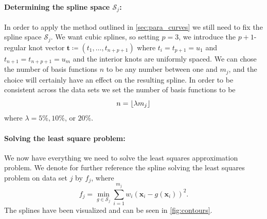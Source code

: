 \documentclass[article]{memoir}
\newcommand{\x}{\mathbf{x}}
\renewcommand{\t}{\mathbf{t}}
\renewcommand{\S}{\mathcal{S}}
\begin{document}
\paragraph{Determining the spline space \( \S_j \):}
In order to apply the method outlined in \cref{sec:para_curves} we still need
to fix the spline space \( \S_j \). We want cubic splines, so setting \( p = 3
\), we introduce the \( p + 1\)-regular knot vector \(\t \coloneqq (t_1, \dots,
t_{n+p+1})\) where \(t_i = t_{p+1} = u_{1}\) and \(t_{n+1} = t_{n+p+1} =
u_{m}\) and the interior knots are uniformly spaced. We can chose the number of
basis functions \( n \) to be any number between one and \( m_j \), and the
choice will certainly have an effect on the resulting spline. In order to be
consistent across the data sets we set the number of basis functions to be
\begin{equation}
    \notag
    n = \left\lfloor{\lambda m_j}\right\rfloor
\end{equation}
where \( \lambda = 5\%, 10\%\), or \(20\%\).

\paragraph{Solving the least square problem:}

We now have everything we need to solve the least squares approximation
problem. We denote for further reference the spline solving the least squares
problem on data set \( j \) by \(f_j\), where
\begin{equation}
    f_j = \min_{g \in \S_j} \sum^{m_j}_{i=1} w_i (\x_i - g(\x_i))^2.
\end{equation}
The splines have been visualized and can be seen in \cref{fig:contours}.
\end{document}
